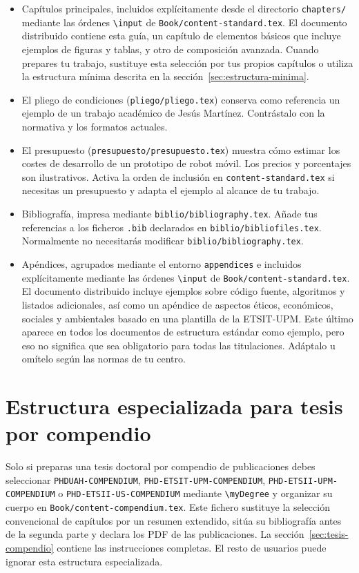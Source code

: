\begin{itemize}
  \item Capítulos principales, incluidos explícitamente desde el directorio \texttt{chapters/} mediante las órdenes \texttt{\textbackslash{}input} de \texttt{Book/content-standard.tex}. El documento distribuido contiene esta guía, un capítulo de elementos básicos que incluye ejemplos de figuras y tablas, y otro de composición avanzada. Cuando prepares tu trabajo, sustituye esta selección por tus propios capítulos o utiliza la estructura mínima descrita en la sección~\ref{sec:estructura-minima}.
  \item El pliego de condiciones (\texttt{pliego/pliego.tex}) conserva como referencia un ejemplo de un trabajo académico de Jesús Martínez. Contrástalo con la normativa y los formatos actuales.
  \item El presupuesto (\texttt{presupuesto/presupuesto.tex}) muestra cómo estimar los costes de desarrollo de un prototipo de robot móvil. Los precios y porcentajes son ilustrativos. Activa la orden de inclusión en \texttt{content-standard.tex} si necesitas un presupuesto y adapta el ejemplo al alcance de tu trabajo.
  \item Bibliografía, impresa mediante \texttt{biblio/bibliography.tex}. Añade tus referencias a los ficheros \texttt{.bib} declarados en \texttt{biblio/bibliofiles.tex}. Normalmente no necesitarás modificar \texttt{biblio/bibliography.tex}.
  \item Apéndices, agrupados mediante el entorno \texttt{appendices} e incluidos explícitamente mediante las órdenes \texttt{\textbackslash{}input} de \texttt{Book/content-standard.tex}. El documento distribuido incluye ejemplos sobre código fuente, algoritmos y listados adicionales, así como un apéndice de aspectos éticos, económicos, sociales y ambientales basado en una plantilla de la ETSIT-UPM. Este último aparece en todos los documentos de estructura estándar como ejemplo, pero eso no significa que sea obligatorio para todas las titulaciones. Adáptalo u omítelo según las normas de tu centro.
\end{itemize}

\section{Estructura especializada para tesis por compendio}

Solo si preparas una tesis doctoral por compendio de publicaciones debes seleccionar \texttt{PHDUAH-COMPENDIUM}, \texttt{PHD-ETSIT-UPM-COMPENDIUM}, \texttt{PHD-ETSII-UPM-COMPENDIUM} o \texttt{PHD-ETSII-US-COMPENDIUM} mediante \texttt{\textbackslash{}myDegree} y organizar su cuerpo en \texttt{Book/content-compendium.tex}. Este fichero sustituye la selección convencional de capítulos por un resumen extendido, sitúa su bibliografía antes de la segunda parte y declara los PDF de las publicaciones. La sección~\ref{sec:tesis-compendio} contiene las instrucciones completas. El resto de usuarios puede ignorar esta estructura especializada.

